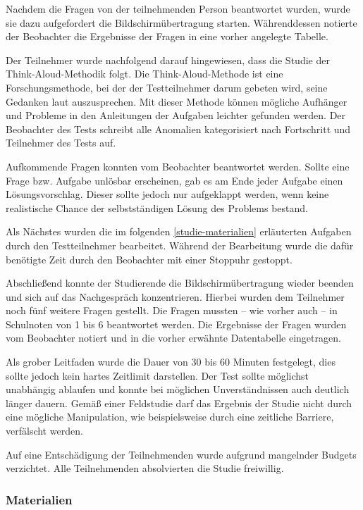 Nachdem die Fragen von der teilnehmenden Person beantwortet wurden, wurde sie
dazu aufgefordert die Bildschirmübertragung starten. Währenddessen notierte der
Beobachter die Ergebnisse der Fragen in eine vorher angelegte Tabelle.

Der Teilnehmer wurde nachfolgend darauf hingewiesen, dass die Studie der
Think-Aloud-Methodik folgt. Die Think-Aloud-Methode ist eine Forschungsmethode,
bei der der Testteilnehmer darum gebeten wird, seine Gedanken laut
auszusprechen. Mit dieser Methode können mögliche Aufhänger und Probleme in den
Anleitungen der Aufgaben leichter gefunden werden. Der Beobachter des Tests
schreibt alle Anomalien kategorisiert nach Fortschritt und Teilnehmer des Tests
auf. \parencite{think-aloud}

Aufkommende Fragen konnten vom Beobachter beantwortet werden. Sollte eine Frage
bzw. Aufgabe unlösbar erscheinen, gab es am Ende jeder Aufgabe einen
Lösungsvorschlag. Dieser sollte jedoch nur aufgeklappt werden, wenn keine
realistische Chance der selbstständigen Lösung des Problems bestand.

Als Nächstes wurden die im folgenden \autoref{studie-materialien} erläuterten
Aufgaben durch den Testteilnehmer bearbeitet. Während der Bearbeitung wurde die
dafür benötigte Zeit durch den Beobachter mit einer Stoppuhr gestoppt.

Abschließend konnte der Studierende die Bildschirmübertragung wieder beenden und
sich auf das Nachgespräch konzentrieren. Hierbei wurden dem Teilnehmer noch
fünf weitere Fragen gestellt. Die Fragen mussten -- wie vorher auch -- in
Schulnoten von 1 bis 6 beantwortet werden. Die Ergebnisse der Fragen wurden vom
Beobachter notiert und in die vorher erwähnte Datentabelle eingetragen.

Als grober Leitfaden wurde die Dauer von 30 bis 60 Minuten festgelegt, dies
sollte jedoch kein hartes Zeitlimit darstellen. Der Test sollte möglichst
unabhängig ablaufen und konnte bei möglichen Unverständnissen auch deutlich
länger dauern. Gemäß einer Feldstudie darf das Ergebnis der Studie nicht durch
eine mögliche  Manipulation, wie beispielsweise durch eine zeitliche Barriere,
verfälscht werden.

Auf eine Entschädigung der Teilnehmenden wurde aufgrund mangelnder Budgets
verzichtet. Alle Teilnehmenden absolvierten die Studie freiwillig.

\subsubsection{Materialien}\label{studie-materialien}
